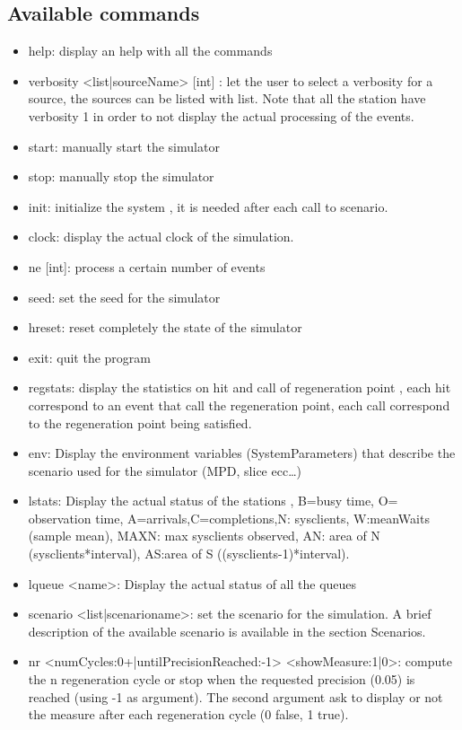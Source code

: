 \documentclass[12pt,a4paper]{article}
\begin{document}
\subsection{Available commands}
\begin{itemize}
    \item help: display an help with all the commands
    \item verbosity <list|sourceName> [int] : let the user to select a verbosity for a source, the sources can be listed with list. Note that all the station have verbosity 1 in order to not display the actual processing of the events.
    \item start: manually start the simulator
    \item stop: manually stop the simulator
    \item init: initialize the system , it is needed after each call to scenario.
    \item clock: display the actual clock of the simulation.
    \item ne [int]: process a certain number of events
    \item seed: set the seed for the simulator
    \item hreset: reset completely the state of the simulator
    \item exit: quit the program
    \item regstats: display the statistics on hit and call of regeneration point , each hit correspond to an event that call the regeneration point, each call correspond to the regeneration point being satisfied.
    \item env: Display the environment variables (SystemParameters) that describe the scenario used for the simulator (MPD, slice ecc\dots)
    \item lstats: Display the actual status of the stations , B=busy time, O= observation time, A=arrivals,C=completions,N: sysclients, W:meanWaits (sample mean), MAXN: max sysclients observed, AN: area of N (sysclients*interval), AS:area of S ((sysclients-1)*interval).
    \item lqueue <name>: Display the actual status of all the queues
    \item scenario <list|scenarioname>: set the scenario for the simulation. A brief description of the available scenario is available in the section Scenarios.
    \item nr <numCycles:0+|untilPrecisionReached:-1> <showMeasure:1|0>: compute the n regeneration cycle or stop when the requested precision (0.05) is reached (using -1 as argument). The second argument ask to display or not the measure after each regeneration cycle (0 false, 1 true).

\end{itemize}
\end{document}
